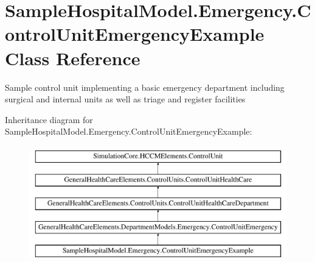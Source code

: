 \hypertarget{class_sample_hospital_model_1_1_emergency_1_1_control_unit_emergency_example}{}\section{Sample\+Hospital\+Model.\+Emergency.\+Control\+Unit\+Emergency\+Example Class Reference}
\label{class_sample_hospital_model_1_1_emergency_1_1_control_unit_emergency_example}


Sample control unit implementing a basic emergency department including surgical and internal units as well as triage and register facilities  


Inheritance diagram for Sample\+Hospital\+Model.\+Emergency.\+Control\+Unit\+Emergency\+Example\+:\begin{figure}[H]
\begin{center}
\leavevmode
\includegraphics[height=5.000000cm]{class_sample_hospital_model_1_1_emergency_1_1_control_unit_emergency_example}
\end{center}
\end{figure}
